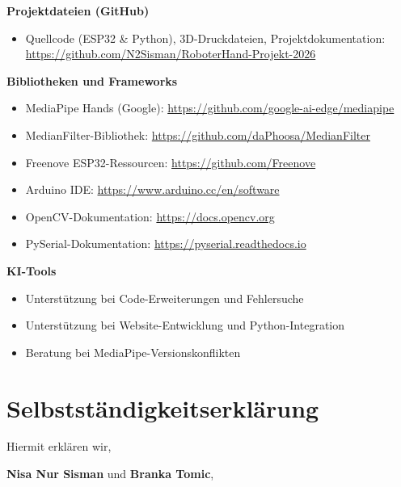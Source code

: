 \documentclass[12pt,a4paper]{article}
\begin{document}
\vspace{0.5em}
\textbf{Projektdateien (GitHub)}
\begin{itemize}[itemsep=4pt]
    \item Quellcode (ESP32 \& Python), 3D-Druckdateien, Projektdokumentation: \\
    \url{https://github.com/N2Sisman/RoboterHand-Projekt-2026}
\end{itemize}

\vspace{0.5em}
\textbf{Bibliotheken und Frameworks}
\begin{itemize}[itemsep=4pt]
    \item MediaPipe Hands (Google): \url{https://github.com/google-ai-edge/mediapipe}
    \item MedianFilter-Bibliothek: \url{https://github.com/daPhoosa/MedianFilter}
    \item Freenove ESP32-Ressourcen: \url{https://github.com/Freenove}
    \item Arduino IDE: \url{https://www.arduino.cc/en/software}
    \item OpenCV-Dokumentation: \url{https://docs.opencv.org}
    \item PySerial-Dokumentation: \url{https://pyserial.readthedocs.io}
\end{itemize}

\vspace{0.5em}
\textbf{KI-Tools}
\begin{itemize}[itemsep=4pt]
    \item Unterstützung bei Code-Erweiterungen und Fehlersuche
    \item Unterstützung bei Website-Entwicklung und Python-Integration
    \item Beratung bei MediaPipe-Versionskonflikten
\end{itemize}

\newpage

\section*{Selbstständigkeitserklärung}

Hiermit erklären wir,

\vspace{0.5cm}
\textbf{Nisa Nur Sisman} und \textbf{Branka Tomic},
\end{document}

